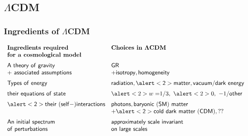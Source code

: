 \documentclass[xcolor=dvipsnames]{beamer}
\begin{document}
\subsection{$\Lambda$CDM}

\begin{frame}
  \frametitle{Ingredients of $\Lambda$CDM}

  $\begin{array}{ll}  
  {\sf \textbf{Ingredients\ required}} & {\sf \textbf{Choices\ in\ }}\boldsymbol\Lambda{\sf \textbf{CDM}} \\
  {\sf \textbf{for\ a\ cosmological\ model}} &  \vspace{2mm}\\
  {\sf A\ theory\ of\ gravity} & {\sf GR}  \\
  {\sf +\ associated\ assumptions} & + {\sf isotropy, homogeneity} \vspace{2mm}\\ 
  {\sf Types\ of\ energy} & {\sf radiation, \alert<2>{matter}, vacuum/dark\ energy} \vspace{2mm}\\
  {\sf their\ equations\ of\ state} & \alert<2>{w =} 1/3,\ \alert<2>{0},\ -1/{\sf other} \vspace{2mm}\\
  {\sf \alert<2>{their\ (self-)interactions}} & {\sf photons, baryonic\ (SM)\ matter} \\
  & +{\sf \alert<2>{cold\ dark\ matter\ (CDM)}, ??} \vspace{2mm}\\
  {\sf An\ initial\ spectrum} & {\sf approximately\ scale\ invariant} \\ 
  {\sf of\ perturbations} & {\sf on\ large\ scales}
  \end{array}$

\end{frame}
\end{document}
